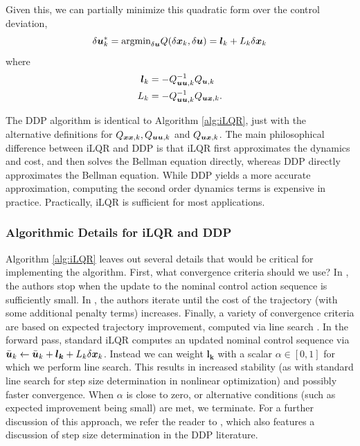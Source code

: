 Given this, we can partially minimize this quadratic form over the control deviation,
\begin{equation}
    \delta \bm{u}_k^* = \text{argmin}_{\delta \bm{u}} Q(\delta \bm{x}_k, \delta \bm{u}) = \bm{l}_k + L_k \delta \bm{x}_k
\end{equation}
where 
\begin{align}
    \bm{l}_k &= - Q_{\bm{u} \bm{u},k}^{-1} Q_{\bm{u},k}\\
    L_k &= - Q_{\bm{u} \bm{u},k}^{-1} Q_{\bm{u} \bm{x},k}. 
\end{align}

The DDP algorithm is identical to Algorithm \ref{alg:iLQR}, just with the alternative definitions for $Q_{\bm{x} \bm{x},k}, Q_{\bm{u} \bm{u},k}$ and $Q_{\bm{u} \bm{x},k}$. The main philosophical difference between iLQR and DDP is that iLQR first approximates the dynamics and cost, and then solves the Bellman equation directly, whereas DDP directly approximates the Bellman equation. While DDP yields a more accurate approximation, computing the second order dynamics terms is expensive in practice. Practically, iLQR is sufficient for most applications. 

\subsubsection{Algorithmic Details for iLQR and DDP}


Algorithm \ref{alg:iLQR} leaves out several details that would be critical for implementing the algorithm. First, what convergence criteria should we use? In \cite{todorov2005generalized}, the authors stop when the update to the nominal control action sequence is sufficiently small. In \cite{levine2014learning}, the authors iterate until the cost of the trajectory (with some additional penalty terms) increases. Finally, a variety of convergence criteria are based on expected trajectory improvement, computed via line search \cite{mayne1970ddp, tassa2012synthesis}.
In the forward pass, standard iLQR computes an updated nominal control sequence via $\bar{\bm{u}}_k \gets \bar{\bm{u}}_k + \bm{l_k} + L_k \delta \bm{x}_k$. Instead we can weight $\bm{l_k}$ with a scalar $\alpha \in [0,1]$ for which we perform line search. This results in increased stability (as with standard line search for step size determination in nonlinear optimization) and possibly faster convergence. When $\alpha$ is close to zero, or alternative conditions (such as expected improvement being small) are met, we terminate. For a further discussion of this approach, we refer the reader to \cite{tassa2012synthesis}, which also features a discussion of step size determination in the DDP literature.

